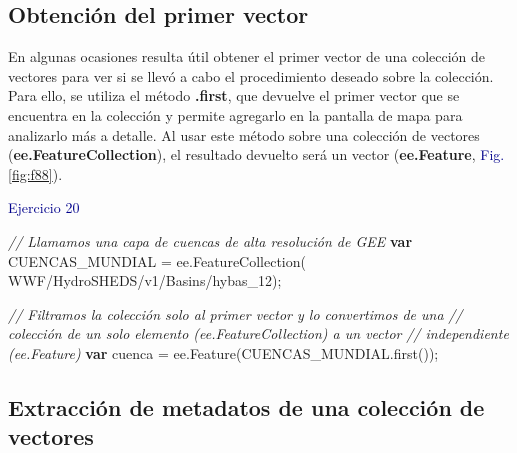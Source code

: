 \documentclass[
  12pt,
  letterpaper,
  twoside]{book}
\newenvironment{Shaded}{\begin{snugshade}}{\end{snugshade}}
\newcommand{\CommentTok}[1]{\textcolor[rgb]{0.24,0.58,0.00}{\textit{#1}}}
\newcommand{\FunctionTok}[1]{\textcolor[rgb]{0.48,0.12,0.64}{#1}}
\newcommand{\KeywordTok}[1]{\textcolor[rgb]{0.00,0.00,0.00}{\textbf{#1}}}
\newcommand{\NormalTok}[1]{#1}
\newcommand{\OperatorTok}[1]{\textcolor[rgb]{0.00,0.00,0.00}{#1}}
\newcommand{\StringTok}[1]{\textcolor[rgb]{0.87,0.29,0.22}{#1}}
\newcommand\boldpurple[1]{\textcolor{darkpurple}{\textbf{#1}}}
\begin{document}
\hypertarget{obtenciuxf3n-del-primer-vector}{%
\subsection*{Obtención del primer vector}\label{obtenciuxf3n-del-primer-vector}}

En algunas ocasiones resulta útil obtener el primer vector de una colección de vectores para ver si se llevó a cabo el procedimiento deseado sobre la colección. Para ello, se utiliza el método \boldpurple{.first}, que devuelve el primer vector que se encuentra en la colección y permite agregarlo en la pantalla de mapa para analizarlo más a detalle. Al usar este método sobre una colección de vectores (\boldpurple{ee.FeatureCollection}), el resultado devuelto será un vector (\boldpurple{ee.Feature}, \textcolor{darkblue}{Fig.} \ref{fig:f88}).

\textcolor{darkblue}{Ejercicio 20}

\begin{Shaded}
\begin{Highlighting}[]
\CommentTok{// Llamamos una capa de cuencas de alta resolución de GEE}
\KeywordTok{var}\NormalTok{ CUENCAS\_MUNDIAL }\OperatorTok{=}\NormalTok{ ee}\OperatorTok{.}\FunctionTok{FeatureCollection}\NormalTok{(}
  \StringTok{\textquotesingle{}WWF/HydroSHEDS/v1/Basins/hybas\_12\textquotesingle{}}\NormalTok{)}\OperatorTok{;}
 
\CommentTok{// Filtramos la colección solo al primer vector y lo convertimos de una}
\CommentTok{// colección de un solo elemento (ee.FeatureCollection) a un vector }
\CommentTok{// independiente (ee.Feature)}
\KeywordTok{var}\NormalTok{ cuenca }\OperatorTok{=}\NormalTok{ ee}\OperatorTok{.}\FunctionTok{Feature}\NormalTok{(CUENCAS\_MUNDIAL}\OperatorTok{.}\FunctionTok{first}\NormalTok{())}\OperatorTok{;} 
\end{Highlighting}
\end{Shaded}

\hypertarget{extracciuxf3n-de-metadatos-de-una-colecciuxf3n-de-vectores}{%
\subsection*{Extracción de metadatos de una colección de vectores}\label{extracciuxf3n-de-metadatos-de-una-colecciuxf3n-de-vectores}}
\end{document}
